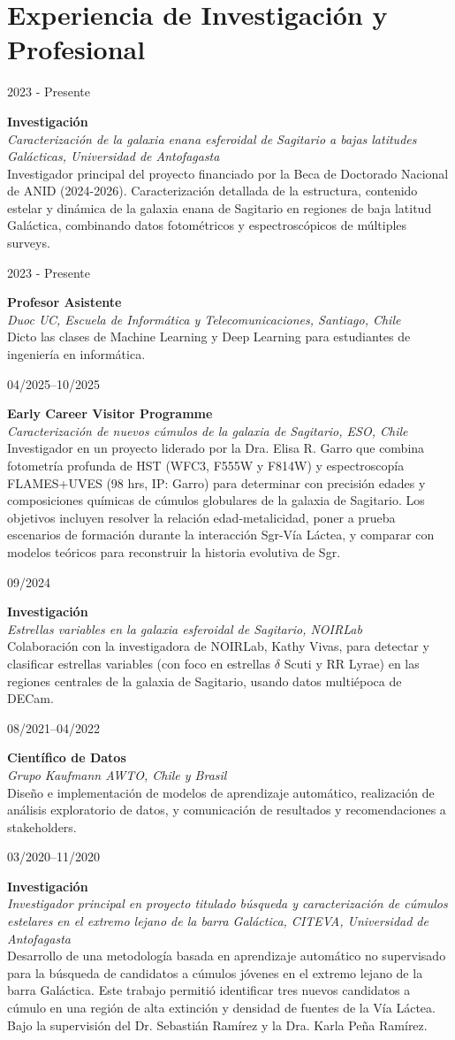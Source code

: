 \documentclass[10pt, a4paper]{article}
\newlength{\datebox}
\newlength{\textbox}
\newcommand{\workitem}[4]{\noindent\parbox[t]{\datebox}{#1}%
    \parbox[t]{\textbox}{\textbf{\textcolor{ViridianGreen}{#2}}\\
    \textit{#3}\\\textcolor{Jet}{\small #4}}\par\vspace{0.4cm}}
\begin{document}
\section*{Experiencia de Investigación y Profesional}
\workitem{2023 - Presente}{Investigación}{Caracterización de la galaxia enana esferoidal de Sagitario a bajas latitudes Galácticas, Universidad de Antofagasta}{Investigador principal del proyecto financiado por la Beca de Doctorado Nacional de ANID (2024-2026). Caracterización detallada de la estructura, contenido estelar y dinámica de la galaxia enana de Sagitario en regiones de baja latitud Galáctica, combinando datos fotométricos y espectroscópicos de múltiples surveys.}
\workitem{2023 - Presente}{Profesor Asistente}{Duoc UC, Escuela de Informática y Telecomunicaciones, Santiago, Chile}{Dicto las clases de Machine Learning y Deep Learning para estudiantes de ingeniería en informática.}
\workitem{04/2025--10/2025}{Early Career Visitor Programme}{Caracterización de nuevos cúmulos de la galaxia de Sagitario, ESO, Chile}{Investigador en un proyecto liderado por la Dra. Elisa R. Garro que combina fotometría profunda de HST (WFC3, F555W y F814W) y espectroscopía FLAMES+UVES (98 hrs, IP: Garro) para determinar con precisión edades y composiciones químicas de cúmulos globulares de la galaxia de Sagitario. Los objetivos incluyen resolver la relación edad-metalicidad, poner a prueba escenarios de formación durante la interacción Sgr-Vía Láctea, y comparar con modelos teóricos para reconstruir la historia evolutiva de Sgr.}
\workitem{09/2024}{Investigación}{Estrellas variables en la galaxia esferoidal de Sagitario, NOIRLab}{Colaboración con la investigadora de NOIRLab, Kathy Vivas, para detectar y clasificar estrellas variables (con foco en estrellas $\delta$ Scuti y RR Lyrae) en las regiones centrales de la galaxia de Sagitario, usando datos multiépoca de DECam.}
\workitem{08/2021--04/2022}{Científico de Datos}{Grupo Kaufmann AWTO, Chile y Brasil}{Diseño e implementación de modelos de aprendizaje automático, realización de análisis exploratorio de datos, y comunicación de resultados y recomendaciones a stakeholders.}
\workitem{03/2020--11/2020}{Investigación}{Investigador principal en proyecto titulado búsqueda y caracterización de cúmulos estelares en el extremo lejano de la barra Galáctica, CITEVA, Universidad de Antofagasta}{Desarrollo de una metodología basada en aprendizaje automático no supervisado para la búsqueda de candidatos a cúmulos jóvenes en el extremo lejano de la barra Galáctica. Este trabajo permitió identificar tres nuevos candidatos a cúmulo en una región de alta extinción y densidad de fuentes de la Vía Láctea. Bajo la supervisión del Dr. Sebastián Ramírez y la Dra. Karla Peña Ramírez.}
\end{document}

